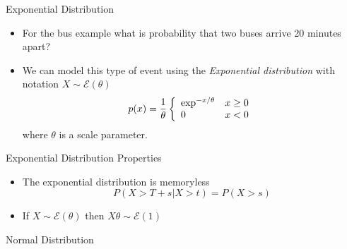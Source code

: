\documentclass{beamer}
\begin{document}
\begin{frame}{Exponential Distribution} 
\begin{itemize} 
 \item For the bus example what is probability that two buses arrive 20 minutes apart? 
 \item We can model this type of event using the \emph{Exponential distribution} with notation $X \sim \mathcal{E}(\theta)$
 \begin{displaymath}
  p(x) = \frac{1}{\theta} \left\{ \begin{array}{l l} \exp^{-x/\theta} & x \geq 0 \\ 0 & x < 0 \end{array} \right. 
 \end{displaymath}
  where $\theta$ is a scale parameter. 
\end{itemize}
\end{frame}

\begin{frame}{Exponential Distribution Properties}
\begin{itemize} 
 \item The exponential distribution is memoryless 
 \begin{displaymath}
  P(X > T + s | X > t) = P(X > s)
 \end{displaymath}
\item If $X \sim \mathcal{E}(\theta)$ then $X\theta \sim \mathcal{E}(1)$
\end{itemize}
\end{frame}

\begin{frame}{Normal Distribution}  
 
\end{frame}
\end{document}
